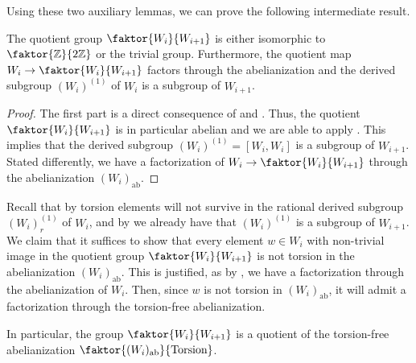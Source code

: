Using these two auxiliary lemmas, we can prove the following intermediate result.

\begin{proposition}\label{prop:factorization}
    The quotient group \(\faktor{W_{i}}{W_{i+1}}\) is either isomorphic to \(\faktor{\Z}{2\Z}\) or the trivial group.
    Furthermore, the quotient map \(W_i \to \faktor{W_i}{W_{i+1}}\) factors through the abelianization and the derived subgroup \((W_i)^{(1)}\) of \(W_i\) is a subgroup of \(W_{i+1}\).
\end{proposition}
\begin{proof}
    The first part is a direct consequence of  and .
    Thus, the quotient \(\faktor{W_i}{W_{i+1}}\) is in particular abelian and we are able to apply .
    This implies that the derived subgroup \((W_i)^{(1)} = [W_i, W_i]\) is a subgroup of \(W_{i+1}\).
    Stated differently, we have a factorization of \(W_i \to \faktor{W_i}{W_{i+1}}\) through the abelianization \((W_i)_{\text{ab}}\).
\end{proof}
\newpage

\begin{remark}\label{rmk:factorization}
    Recall that by  torsion elements will not survive in the rational derived subgroup \((W_i)_r^{(1)}\) of \(W_i\), and by  we already have that \((W_i)^{(1)}\) is a subgroup of \(W_{i+1}\).
    We claim that it suffices to show that every element \(w \in W_i\) with non-trivial image in the quotient group \(\faktor{W_i}{W_{i+1}}\) is not torsion in the abelianization \((W_i)_{\text{ab}}\).
    This is justified, as by , we have a factorization through the abelianization of \(W_i\).
    Then, since \(w\) is not torsion in \((W_i)_{\text{ab}}\), it will admit a factorization through the torsion-free abelianization.
    \begin{figure}[h!]
        \centering
    \end{figure}\vspace*{-1\parskip}
    
    \noindent
    In particular, the group \(\faktor{W_i}{W_{i+1}}\) is a quotient of the torsion-free abelianization \(\faktor{(W_i)_{\text{ab}}}{\text{Torsion}}\).
\end{remark}


